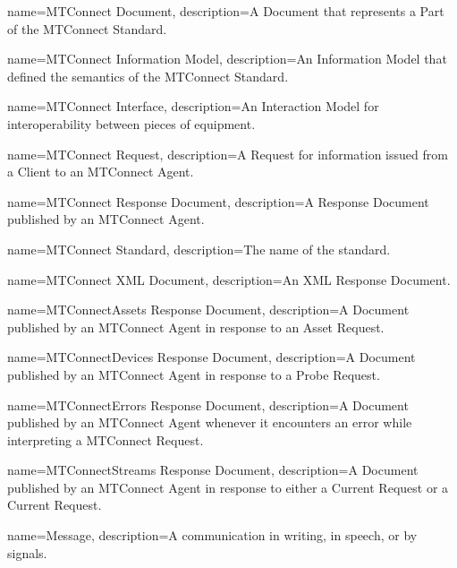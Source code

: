 {
    name={MTConnect Document},
	description={A \gls{Document} that represents a \gls{Part} of the MTConnect Standard.}
}

{
    name={MTConnect Information Model},
	description={An \gls{Information Model} that defined the semantics of the MTConnect Standard.}
}

{
    name={MTConnect Interface},
	description={An \gls{Interaction Model} for interoperability between pieces of equipment.}
}

{
    name={MTConnect Request},
	description={A \gls{Request} for information issued from a \gls{Client} to an \gls{MTConnect Agent}.}
}

{
    name={MTConnect Response Document},
	description={A \gls{Response Document} published by an \gls{MTConnect Agent}.}
}

{
    name={MTConnect Standard},
	description={The name of the standard.}
}

{
    name={MTConnect XML Document},
	description={An XML \gls{Response Document}.}
}

{
    name={MTConnectAssets Response Document},
	description={A \gls{Document} published by an \gls{MTConnect Agent} in response to an \gls{Asset Request}.}
}

{
    name={MTConnectDevices Response Document},
	description={A \gls{Document} published by an \gls{MTConnect Agent} in response to a \gls{Probe Request}.}
}

{
    name={MTConnectErrors Response Document},
	description={A \gls{Document} published by an \gls{MTConnect Agent} whenever it encounters an error while interpreting a \gls{MTConnect Request}.}
}

{
    name={MTConnectStreams Response Document},
	description={A \gls{Document} published by an \gls{MTConnect Agent} in response to either a \gls{Current Request} or a \gls{Current Request}.}
}

{
    name={Message},
	description={A communication in writing, in speech, or by signals.}
}

